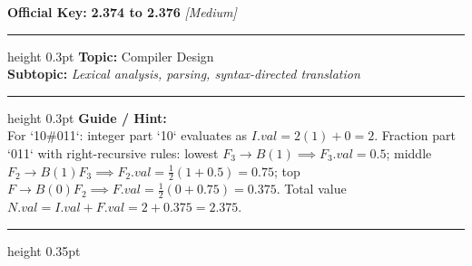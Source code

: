 \documentclass[a4paper,10pt]{article}
\begin{document}
\begin{tcolorbox}
\textbf{Official Key:} \textbf{\large 2.374 to 2.376} \hfill \textit{\small [Medium]}
\vspace{2pt}\hrule height 0.3pt\vspace{3pt}
\textbf{Topic:} Compiler Design \\
\textbf{Subtopic:} \textit{Lexical analysis, parsing, syntax-directed translation}
\vspace{2pt}\hrule height 0.3pt\vspace{3pt}
\textbf{Guide / Hint:} \\
{\small For `10\#011`: integer part `10` evaluates as $I.val = 2(1) + 0 = 2$. Fraction part `011` with right-recursive rules: lowest $F_3 \to B(1) \implies F_3.val = 0.5$; middle $F_2 \to B(1) F_3 \implies F_2.val = \frac{1}{2}(1 + 0.5) = 0.75$; top $F \to B(0) F_2 \implies F.val = \frac{1}{2}(0 + 0.75) = 0.375$. Total value $N.val = I.val + F.val = 2 + 0.375 = 2.375$.}

\end{tcolorbox}
\vspace{6pt}\hrule height 0.35pt\vspace{6pt}
\noindent
\end{document}
